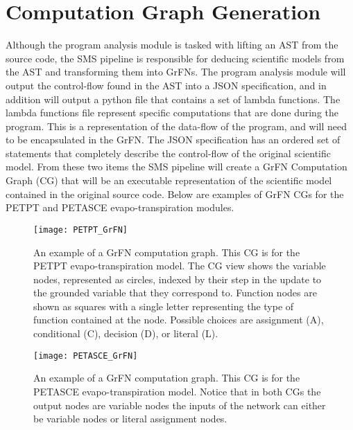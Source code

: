 \section{Computation Graph Generation\label{sec:cg_gen}}
Although the program analysis module is tasked with lifting an AST from the source code, the SMS pipeline is responsible for deducing scientific models from the AST and transforming them into GrFNs.
The program analysis module will output the control-flow found in the AST into a JSON specification, and in addition will output a python file that contains a set of lambda functions.
The lambda functions file represent specific computations that are done during the program.
This is a representation of the data-flow of the program, and will need to be encapsulated in the GrFN.
The JSON specification has an ordered set of statements that completely describe the control-flow of the original scientific model.
From these two items the SMS pipeline will create a GrFN Computation Graph (CG) that will be an executable representation of the scientific model contained in the original source code.
Below are examples of GrFN CGs for the PETPT and PETASCE evapo-transpiration modules.

\FloatBarrier
\begin{figure}[!htbp]
    \label{petpt_grfn}
    \centering
    \texttt{[image: PETPT\_GrFN]}%
    \caption[PETPT GrFN Computation Graph]{An example of a GrFN computation graph. This CG is for the PETPT evapo-transpiration model. The CG view shows the variable nodes, represented as circles, indexed by their step in the update to the grounded variable that they correspond to. Function nodes are shown as squares with a single letter representing the type of function contained at the node. Possible choices are assignment (A), conditional (C), decision (D), or literal (L).}
\end{figure}
\FloatBarrier

\FloatBarrier
\begin{figure}[!htbp]
    \label{petasce_grfn}
    \centering
    \texttt{[image: PETASCE\_GrFN]}%
    \caption[PETASCE GrFN Computation Graph]{An example of a GrFN computation graph. This CG is for the PETASCE evapo-transpiration model. Notice that in both CGs the output nodes are variable nodes the inputs of the network can either be variable nodes or literal assignment nodes.}
\end{figure}
\FloatBarrier

